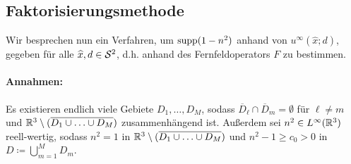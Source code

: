 \setcounter{subsection}{11}
\setcounter{section}{12}
\setcounter{mydef}{0}
\setcounter{equation}{0}

\subsection{Faktorisierungsmethode}
Wir besprechen nun ein Verfahren, um \(\operatorname{supp}(1-n^2)\) anhand von \(u^\infty(\widehat{x};d)\), gegeben für alle \(\widehat{x},d\in\mathcal{S}^2\), d.h. anhand des Fernfeldoperators \(F\) zu bestimmen.

\paragraph{Annahmen:}
Es existieren endlich viele Gebiete \(D_1,\ldots,D_M\), sodass \(\overline{D}_\ell\cap\overline{D}_m=\emptyset\) für \(\ell\neq m\) und \(\mathbb{R}^3\setminus(\overline{D_1\cup\ldots\cup D_M})\) zusammenhängend ist. Außerdem sei \(n^2\in L^\infty(\mathbb{R}^3)\) reell-wertig, sodass \(n^2=1\) in \(\mathbb{R}^3\setminus(\overline{D_1\cup\ldots\cup D_M})\) und \(n^2-1\geq c_0>0\) in \(D\coloneqq\bigcup_{m=1}^MD_m\).\vspace{2mm}

